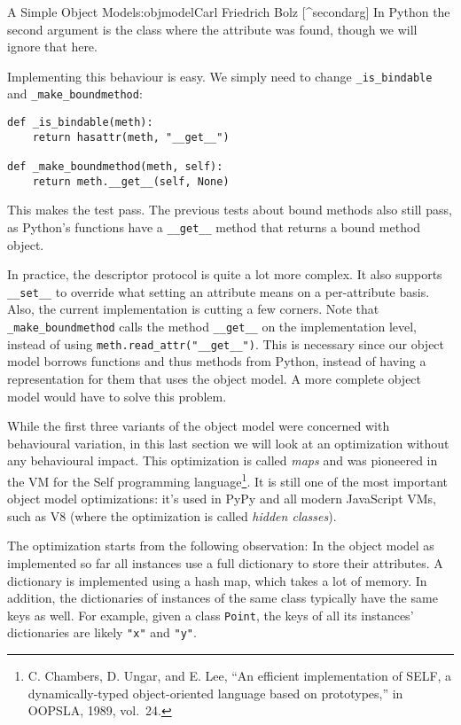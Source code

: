 \begin{aosachapter}{A Simple Object Model}{s:objmodel}{Carl Friedrich Bolz}
{[}\^{}secondarg{]} In Python the second argument is the class where the
attribute was found, though we will ignore that here.

Implementing this behaviour is easy. We simply need to change
\texttt{\_is\_bindable} and \texttt{\_make\_boundmethod}:

\begin{verbatim}
def _is_bindable(meth):
    return hasattr(meth, "__get__")

def _make_boundmethod(meth, self):
    return meth.__get__(self, None)
\end{verbatim}

This makes the test pass. The previous tests about bound methods also
still pass, as Python's functions have a \texttt{\_\_get\_\_} method
that returns a bound method object.

In practice, the descriptor protocol is quite a lot more complex. It
also supports \texttt{\_\_set\_\_} to override what setting an attribute
means on a per-attribute basis. Also, the current implementation is
cutting a few corners. Note that \texttt{\_make\_boundmethod} calls the
method \texttt{\_\_get\_\_} on the implementation level, instead of
using \texttt{meth.read\_attr("\_\_get\_\_")}. This is necessary since
our object model borrows functions and thus methods from Python, instead
of having a representation for them that uses the object model. A more
complete object model would have to solve this problem.

\label{instance-optimization}

While the first three variants of the object model were concerned with
behavioural variation, in this last section we will look at an
optimization without any behavioural impact. This optimization is called
\emph{maps} and was pioneered in the VM for the Self programming
language\footnote{C. Chambers, D. Ungar, and E. Lee, ``An efficient
  implementation of SELF, a dynamically-typed object-oriented language
  based on prototypes,'' in OOPSLA, 1989, vol.~24.}. It is still one of
the most important object model optimizations: it's used in PyPy and all
modern JavaScript VMs, such as V8 (where the optimization is called
\emph{hidden classes}).

The optimization starts from the following observation: In the object
model as implemented so far all instances use a full dictionary to store
their attributes. A dictionary is implemented using a hash map, which
takes a lot of memory. In addition, the dictionaries of instances of the
same class typically have the same keys as well. For example, given a
class \texttt{Point}, the keys of all its instances' dictionaries are
likely \texttt{"x"} and \texttt{"y"}.


\end{aosachapter}
